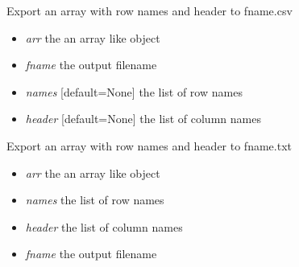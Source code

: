 \documentclass[a4paper,11pt,english]{sphinxmanual}
\begin{document}

\begin{fulllineitems}
\label{modules_doc:cbmpy.CBTools.exportLabelledArrayWithHeader2CSV}
Export an array with row names and header to fname.csv
\begin{itemize}
\item {} 
\emph{arr} the an array like object

\item {} 
\emph{fname} the output filename

\item {} 
\emph{names} {[}default=None{]} the list of row names

\item {} 
\emph{header} {[}default=None{]} the list of column names

\end{itemize}

\end{fulllineitems}


\begin{fulllineitems}
\label{modules_doc:cbmpy.CBTools.exportLabelledArrayWithHeader2TXT}
Export an array with row names and header to fname.txt
\begin{itemize}
\item {} 
\emph{arr} the an array like object

\item {} 
\emph{names} the list of row names

\item {} 
\emph{header} the list of column names

\item {} 
\emph{fname} the output filename

\end{itemize}

\end{fulllineitems}

\end{document}
